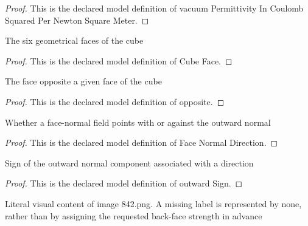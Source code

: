 \begin{proof}
  This is the declared model definition of vacuum Permittivity In Coulomb Squared Per Newton Square Meter.
\end{proof}
\begin{definition}
  \label{def:physics:phyx-mini-0842:phyxminiproblems-problemphyxmini0842-cubeface}
  The six geometrical faces of the cube
\end{definition}
\begin{proof}
  This is the declared model definition of Cube Face.
\end{proof}
\begin{definition}[opposite]
  \label{def:physics:phyx-mini-0842:phyxminiproblems-problemphyxmini0842-cubeface-opposite}
  The face opposite a given face of the cube
\end{definition}
\begin{proof}
  This is the declared model definition of opposite.
\end{proof}
\begin{definition}
  \label{def:physics:phyx-mini-0842:phyxminiproblems-problemphyxmini0842-facenormaldirection}
  Whether a face-normal field points with or against the outward normal
\end{definition}
\begin{proof}
  This is the declared model definition of Face Normal Direction.
\end{proof}
\begin{definition}
  \label{def:physics:phyx-mini-0842:phyxminiproblems-problemphyxmini0842-facenormaldirection-outwardsign}
  Sign of the outward normal component associated with a direction
\end{definition}
\begin{proof}
  This is the declared model definition of outward Sign.
\end{proof}
\begin{definition}
  \label{def:physics:phyx-mini-0842:phyxminiproblems-problemphyxmini0842-cubefieldfigure}
  Literal visual content of image 842.png. A missing label is represented by none, rather than by assigning the requested back-face strength in advance
\end{definition}
